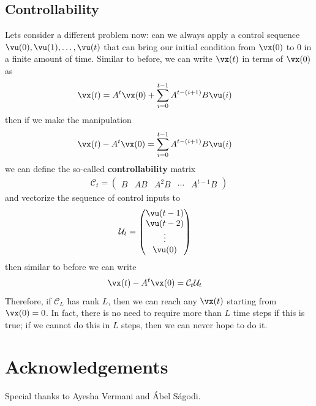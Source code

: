 \documentclass[a4paper,11pt]{exam}
\newcounter{ct}
\begin{document}
\subsection{Controllability}
Lets consider a different problem now: can we always apply a control sequence $\vu(0), \vu(1), \ldots, \vu(t)$ that can bring our initial condition from $\vx(0)$ to $0$ in a finite amount of time.  Similar to before, we can write $\vx(t)$ in terms of $\vx(0)$ as
\begin{align}
    \vx(t) &= A^t \vx(0) + \sum_{i=0}^{t-1} A^{t - (i+1)} B \vu(i)
\end{align}
then if we make the manipulation
\begin{align}
    \vx(t) - A^t \vx(0) &= \sum_{i=0}^{t-1} A^{t - (i+1)} B \vu(i)
\end{align}
we can define the so-called \textbf{controllability} matrix
\begin{align}
    \mathcal{C}_t = \begin{pmatrix} B & AB & A^2B & \cdots & A^{t-1}B \end{pmatrix}
\end{align}
and vectorize the sequence of control inputs to
\begin{align}
    \mathcal{U}_t &= \begin{pmatrix} \vu(t-1) \\ \vu(t-2) \\ \vdots \\ \vu(0) \end{pmatrix}
\end{align}
then similar to before we can write
\begin{align}
    \vx(t) - A^t \vx(0) &= \mathcal{C}_t \mathcal{U}_t
\end{align}
Therefore, if $\mathcal{C}_L$ has rank $L$, then we can reach any $\vx(t)$ starting from $\vx(0) = 0$. In fact, there is no need to require more than $L$ time steps if this is true; if we cannot do this in $L$ steps, then we can never hope to do it.

\newpage
\section*{Acknowledgements}
Special thanks to Ayesha Vermani and \'Abel S\'agodi.



\end{document}
